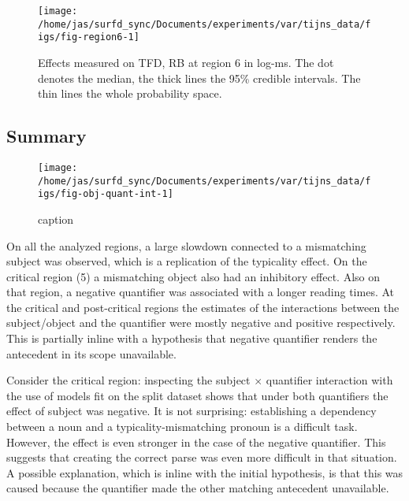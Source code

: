\begin{knitrout}
\color{fgcolor}\begin{figure}
\texttt{[image: /home/jas/surfd\_sync/Documents/experiments/var/tijns\_data/figs/fig-region6-1]} \caption{\label{fig:region6-rb-tfd}Effects measured on TFD, RB  at region 6 in log-ms. The dot denotes the median, the thick lines the 95\% credible intervals. The thin lines the whole probability space.}\label{fig:fig-region6}
\end{figure}

\end{knitrout}

\subsection{Summary}

\begin{knitrout}
\color{fgcolor}\begin{figure}
\texttt{[image: /home/jas/surfd\_sync/Documents/experiments/var/tijns\_data/figs/fig-obj-quant-int-1]} \caption[caption]{caption}\label{fig:fig-obj-quant-int}
\end{figure}

\end{knitrout}

On all the analyzed regions, a large slowdown connected to a mismatching subject was observed, which is a replication of the typicality effect. On the critical region (5) a mismatching object also had an inhibitory effect.
Also on that region, a negative quantifier was associated with a longer reading times. At the critical and post-critical regions the estimates of the interactions between the subject/object and the quantifier were mostly negative and positive respectively. This is partially inline with a hypothesis that negative quantifier renders the antecedent in its scope unavailable.

Consider the critical region: inspecting the subject $\times$ quantifier interaction with the use of models fit on the split dataset shows that under both quantifiers the effect of subject was negative. It is not surprising: establishing a dependency between a noun and a typicality-mismatching pronoun is a difficult task. However, the effect is even stronger in the case of the negative quantifier. This suggests that creating the correct parse was even more difficult in that situation. A possible explanation, which is inline with the initial hypothesis, is that this was caused because the quantifier made the other matching antecedent unavailable.

